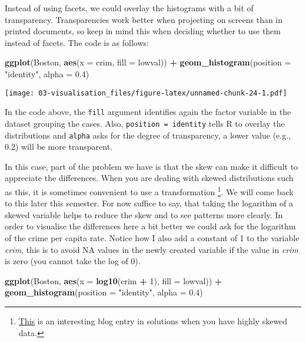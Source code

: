 \documentclass[
]{book}
\newenvironment{Shaded}{\begin{snugshade}}{\end{snugshade}}
\newcommand{\AttributeTok}[1]{\textcolor[rgb]{0.13,0.29,0.53}{#1}}
\newcommand{\DecValTok}[1]{\textcolor[rgb]{0.00,0.00,0.81}{#1}}
\newcommand{\FloatTok}[1]{\textcolor[rgb]{0.00,0.00,0.81}{#1}}
\newcommand{\FunctionTok}[1]{\textcolor[rgb]{0.13,0.29,0.53}{\textbf{#1}}}
\newcommand{\NormalTok}[1]{#1}
\newcommand{\SpecialCharTok}[1]{\textcolor[rgb]{0.81,0.36,0.00}{\textbf{#1}}}
\newcommand{\StringTok}[1]{\textcolor[rgb]{0.31,0.60,0.02}{#1}}
\begin{document}
Instead of using facets, we could overlay the histograms with a bit of transparency. Transparencies work better when projecting on screens than in printed documents, so keep in mind this when deciding whether to use them instead of facets. The code is as follows:

\begin{Shaded}
\begin{Highlighting}[]
\FunctionTok{ggplot}\NormalTok{(Boston, }\FunctionTok{aes}\NormalTok{(}\AttributeTok{x =}\NormalTok{ crim, }\AttributeTok{fill =}\NormalTok{ lowval)) }\SpecialCharTok{+} 
  \FunctionTok{geom\_histogram}\NormalTok{(}\AttributeTok{position =} \StringTok{"identity"}\NormalTok{, }\AttributeTok{alpha =} \FloatTok{0.4}\NormalTok{)}
\end{Highlighting}
\end{Shaded}

\texttt{[image: 03-visualisation\_files/figure-latex/unnamed-chunk-24-1.pdf]}

In the code above, the \texttt{fill} argument identifies again the factor variable in the dataset grouping the cases. Also, \texttt{position\ =\ identity} tells R to overlay the distributions and \texttt{alpha} asks for the degree of transparency, a lower value (e.g., 0.2) will be more transparent.

In this case, part of the problem we have is that the skew can make it difficult to appreciate the differences. When you are dealing with skewed distributions such as this, it is sometimes convenient to use a transformation \footnote{\href{http://tomhopper.me/2010/08/30/graphing-highly-skewed-data/}{This} is an interesting blog entry in solutions when you have highly skewed data.}. We will come back to this later this semester. For now suffice to say, that taking the logarithm of a skewed variable helps to reduce the skew and to see patterns more clearly. In order to visualise the differences here a bit better we could ask for the logarithm of the crime per capita rate. Notice how I also add a constant of 1 to the variable \emph{crim}, this is to avoid NA values in the newly created variable if the value in \emph{crim} is zero (you cannot take the log of 0).

\begin{Shaded}
\begin{Highlighting}[]
\FunctionTok{ggplot}\NormalTok{(Boston, }\FunctionTok{aes}\NormalTok{(}\AttributeTok{x =} \FunctionTok{log10}\NormalTok{(crim }\SpecialCharTok{+} \DecValTok{1}\NormalTok{), }\AttributeTok{fill =}\NormalTok{ lowval)) }\SpecialCharTok{+}
  \FunctionTok{geom\_histogram}\NormalTok{(}\AttributeTok{position =} \StringTok{"identity"}\NormalTok{, }\AttributeTok{alpha =} \FloatTok{0.4}\NormalTok{)}
\end{Highlighting}
\end{Shaded}
\end{document}

